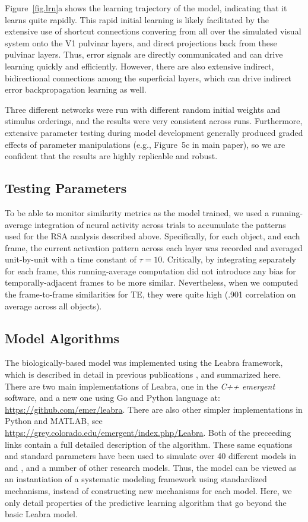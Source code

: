 \documentclass[12pt,twoside]{article}
\newif\myifpdf
\begin{document}
Figure~\ref{fig.lrn}a shows the learning trajectory of the model, indicating that it learns quite rapidly.  This rapid initial learning is likely facilitated by the extensive use of shortcut connections convering from all over the simulated visual system onto the V1 pulvinar layers, and direct projections back from these pulvinar layers.  Thus, error signals are directly communicated and can drive learning quickly and efficiently.  However, there are also extensive indirect, bidirectional connections among the superficial layers, which can drive indirect error backpropagation learning as well.

Three different networks were run with different random initial weights and stimulus orderings, and the results were very consistent across runs.  Furthermore, extensive parameter testing during model development generally produced graded effects of parameter manipulations (e.g., Figure~5c in main paper), so we are confident that the results are highly replicable and robust.

\subsection{Testing Parameters}

To be able to monitor similarity metrics as the model trained, we used a running-average integration of neural activity across trials to accumulate the patterns used for the RSA analysis described above.  Specifically, for each object, and each frame, the current activation pattern across each layer was recorded and averaged unit-by-unit with a time constant of $\tau = 10$. Critically, by integrating separately for each frame, this running-average computation did not introduce any bias for temporally-adjacent frames to be more similar.  Nevertheless, when we computed the frame-to-frame similarities for TE, they were quite high (.901 correlation on average across all objects).

\subsection{Model Algorithms}

The biologically-based model was implemented using the Leabra framework, which is described in detail in previous publications \cite{OReillyMunakataFrankEtAl12,OReillyMunakata00,OReilly98,OReilly96}, and summarized here.  There are two main implementations of Leabra, one in the {\em C++ emergent} software, and a new one using  Go and Python language at: \url{https://github.com/emer/leabra}.  There are also other simpler implementations in Python and MATLAB, see \url{https://grey.colorado.edu/emergent/index.php/Leabra}.   Both of the preceeding links contain a full detailed description of the algorithm.  These same equations and standard parameters have been used to simulate over 40 different models in \cite{OReillyMunakataFrankEtAl12} and \cite{OReillyMunakata00}, and a number of other research models.  Thus, the model can be viewed as an instantiation of a systematic modeling framework using standardized mechanisms, instead of constructing new mechanisms for each model.  Here, we only detail properties of the predictive learning algorithm that go beyond the basic Leabra model.
\end{document}

